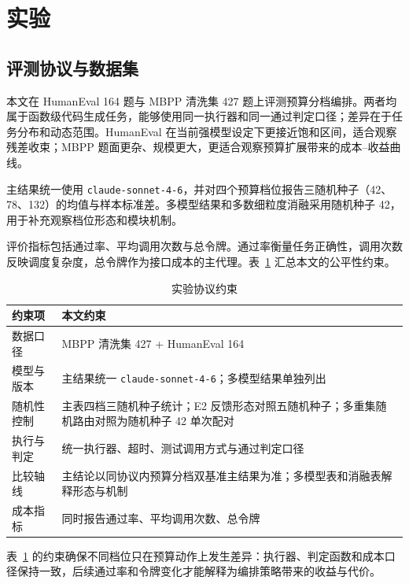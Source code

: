\section{实验}
\label{sec:experiments}

\subsection{评测协议与数据集}
\label{sec:eval-protocol}

本文在 HumanEval 164 题与 MBPP 清洗集 427 题上评测预算分档编排。两者均属于函数级代码生成任务，能够使用同一执行器和同一通过判定口径；差异在于任务分布和动态范围。HumanEval 在当前强模型设定下更接近饱和区间，适合观察残差收束；MBPP 题面更杂、规模更大，更适合观察预算扩展带来的成本--收益曲线。

主结果统一使用 \texttt{claude-sonnet-4-6}，并对四个预算档位报告三随机种子（42、78、132）的均值与样本标准差。多模型结果和多数细粒度消融采用随机种子 42，用于补充观察档位形态和模块机制。

评价指标包括通过率、平均调用次数与总令牌。通过率衡量任务正确性，调用次数反映调度复杂度，总令牌作为接口成本的主代理。表~\ref{tab:protocol_constraints} 汇总本文的公平性约束。

\begin{table}[H]
\centering
\footnotesize
\caption{实验协议约束}
\label{tab:protocol_constraints}
\begin{tabularx}{\linewidth}{p{1.55cm} X}
\toprule
约束项 & 本文约束 \\
\midrule
数据口径 & MBPP 清洗集 427 + HumanEval 164 \\
模型与版本 & 主结果统一 \texttt{claude-sonnet-4-6}；多模型结果单独列出 \\
随机性控制 & 主表四档三随机种子统计；E2 反馈形态对照五随机种子；多重集随机路由对照为随机种子 42 单次配对 \\
执行与判定 & 统一执行器、超时、测试调用方式与通过判定口径 \\
比较轴线 & 主结论以同协议内预算分档双基准主结果为准；多模型表和消融表解释形态与机制 \\
成本指标 & 同时报告通过率、平均调用次数、总令牌 \\
\bottomrule
\end{tabularx}
\end{table}

表~\ref{tab:protocol_constraints} 的约束确保不同档位只在预算动作上发生差异：执行器、判定函数和成本口径保持一致，后续通过率和令牌变化才能解释为编排策略带来的收益与代价。

